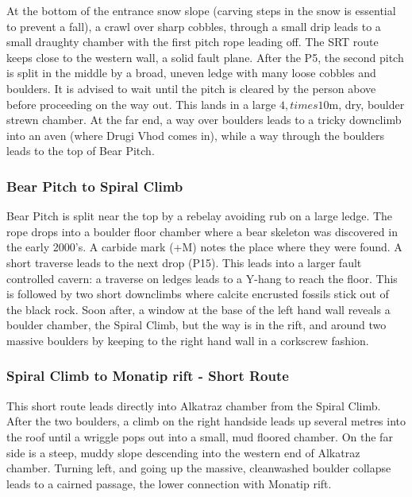 At the bottom of the entrance snow slope (carving steps in the snow is essential to prevent a fall), a crawl over sharp cobbles, through a small drip leads to a small draughty chamber with the first pitch rope leading off. The SRT route keeps close to the western wall, a solid fault plane. After the P5, the second pitch is split in the middle by a broad, uneven ledge with many loose cobbles and boulders. It is advised to wait until the pitch is cleared by the person above before proceeding on the way out. This lands in a large \(4,times10\)m, dry, boulder strewn chamber. At the far end, a way over boulders leads to a tricky downclimb into an aven (where Drugi Vhod comes in), while a way through the boulders leads to the top of Bear Pitch.

\hypertarget{bear-pitch-to-spiral-climb}{%
\subsubsection{Bear Pitch to Spiral Climb}\label{bear-pitch-to-spiral-climb}}

Bear Pitch is split near the top by a rebelay avoiding rub on a large ledge. The rope drops into a boulder floor chamber where a bear skeleton was discovered in the early 2000's. A carbide mark (+M) notes the place where they were found. A short traverse leads to the next drop (P15). This leads into a larger fault controlled cavern: a traverse on ledges leads to a Y-hang to reach the floor. This is followed by two short downclimbs where calcite encrusted fossils stick out of the black rock. Soon after, a window at the base of the left hand wall reveals a boulder chamber, the Spiral Climb, but the way is in the rift, and around two massive boulders by keeping to the right hand wall in a corkscrew fashion.

\hypertarget{spiral-climb-to-monatip-rift---short-route}{%
\subsubsection{Spiral Climb to Monatip rift - Short Route}\label{spiral-climb-to-monatip-rift---short-route}}

This short route leads directly into Alkatraz chamber from the Spiral Climb. After the two boulders, a climb on the right handside leads up several metres into the roof until a wriggle pops out into a small, mud floored chamber. On the far side is a steep, muddy slope descending into the western end of Alkatraz chamber. Turning left, and going up the massive, cleanwashed boulder collapse leads to a cairned passage, the lower connection with Monatip rift.

